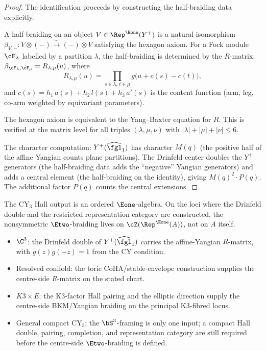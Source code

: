 \begin{proof}
The identification proceeds by constructing the half-braiding data explicitly.

A half-braiding on an object $V \in \Rep^{\Eone}(Y^+)$ is a natural isomorphism $\beta_{V,-} \colon V \otimes (-) \xrightarrow{\sim} (-) \otimes V$ satisfying the hexagon axiom. For a Fock module $\cF_\lambda$ labelled by a partition $\lambda$, the half-braiding is determined by the $R$-matrix: $\beta_{\cF_\lambda, \cF_\mu} = R_{\lambda,\mu}(u)$, where
\begin{equation}
\label{eq:r-matrix-partitions}
 R_{\lambda,\mu}(u) = \prod_{s \in \lambda, \, t \in \mu} g\bigl(u + c(s) - c(t)\bigr),
\end{equation}
and $c(s) = h_1 \, a(s) + h_2 \, l(s) + h_3 \, a'(s)$ is the content function (arm, leg, co-arm weighted by equivariant parameters).

The hexagon axiom is equivalent to the Yang--Baxter equation for $R$. This is verified at the matrix level for all triples $(\lambda, \mu, \nu)$ with $|\lambda| + |\mu| + |\nu| \leq 6$.

The character computation: $Y^+(\widehat{\fgl}_1)$ has character $M(q)$ (the positive half of the affine Yangian counts plane partitions). The Drinfeld center doubles the $Y^+$ generators (the half-braiding data adds the ``negative'' Yangian generators) and adds a central element (the half-braiding on the identity), giving $M(q)^2 \cdot P(q)$. The additional factor $P(q)$ counts the central extensions.
\end{proof}


\begin{corollary}
\label{cor:e1-e2-trivial}
The CY$_3$ Hall output is an ordered \(\Eone\)-algebra. On the loci
where the Drinfeld double and the restricted representation category are
constructed, the nonsymmetric \(\Etwo\)-braiding lives on
\(\cZ(\Rep^{\Eone}(A))\), not on \(A\) itself.
\begin{itemize}
 \item $\C^3$: the Drinfeld double of
 \(Y^+(\widehat{\fgl}_1)\) carries the affine-Yangian \(R\)-matrix, with
 \(g(z)g(-z)=1\) from the CY condition.
 \item Resolved conifold: the toric CoHA/stable-envelope construction
 supplies the centre-side \(R\)-matrix on the stated chart.
 \item $K3 \times E$: the K3-factor Hall pairing and the elliptic
 direction supply the centre-side BKM/Yangian braiding on the principal
 K3-fibred locus.
 \item General compact CY$_3$: the \(\bS^3\)-framing is only one input;
 a compact Hall double, pairing, completion, and representation category
 are still required before the centre-side \(\Etwo\)-braiding is defined.
\end{itemize}
\end{corollary}


